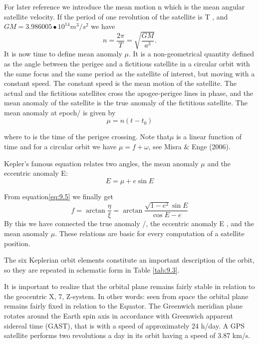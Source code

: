 	For later reference we introduce the mean motion n which is the mean angular satellite velocity. If the period of one revolution of the satellite is T , and $GM = 3.986005 • 10^14 m^3/s^2$ we have
	\begin{equation}\label{eq:9.7}
		n = \dfrac{2\pi}{T} = \sqrt{\dfrac{GM}{a^3}}.
	\end{equation}
	It is now time to define mean anomaly $\mu$. It is a non-geometrical quantity defined as the angle between the perigee and a fictitious satellite in a circular orbit with the same focus and the same period as the satellite of interest, but moving with a constant speed. The constant speed is the mean motion of the satellite. The actual and the fictitious satellites cross the apogee-perigee lines in phase, and the mean anomaly of the satellite is the true anomaly of the fictitious satellite. The mean anomaly at epoch/ is given by
	$$\mu = n(t-t_0)$$
	
	where to is the time of the perigee crossing. Note that$\mu$ is a linear function of time and for a circular orbit we have $\mu = f + \omega$, see Misra $\&$ Enge (2006).
	
	Kepler’s famous equation relates two angles, the mean anomaly $\mu$ and the eccentric anomaly E:
	\begin{equation}\label{eq:9.8}
		E = \mu + e\sin E
	\end{equation}
	
	From equation\ref{eq:9.5} we finally get
	\begin{equation}\label{eq:9.9}
		f = \arctan \frac{\eta}{\xi} = \arctan \dfrac{\sqrt{1-e^2}\sin E}{\cos E-e}
	\end{equation}
	By this we have connected the true anomaly /, the eccentric anomaly E , and the mean anomaly $\mu$. These relations are basic for every computation of a satellite position.
	
	The six Keplerian orbit elements constitute an important description of the orbit, so they are repeated in schematic form in Table \ref{tab:9.3}.
	
	It is important to realize that the orbital plane remains fairly stable in relation to the geocentric X, 7, Z-system. In other words: seen from space the orbital plane remains fairly fixed in relation to the Equator. The Greenwich meridian plane rotates around the Earth spin axis in accordance with Greenwich apparent sidereal time (GAST), that is with a speed of approximately 24 h/day. A GPS satellite performs two revolutions a day in its orbit having a speed of 3.87 km/s.
	
